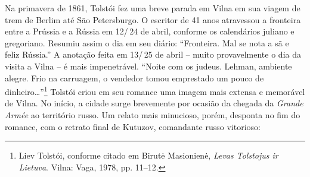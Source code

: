Na primavera de 1861, Tolstói fez uma breve parada em Vilna em sua
viagem de trem de Berlim até São Petersburgo. O escritor de 41 anos atravessou a fronteira entre a Prússia e a Rússia em 12/\,24 de
abril, conforme os calendários juliano e gregoriano. Resumiu assim o
dia em seu diário: ``Fronteira. Mal se nota a sã e feliz Rússia.'' A
anotação feita em 13/\,25 de abril -- muito provavelmente o dia da visita a
Vilna -- é mais impenetrável. ``Noite com os judeus. Lehman, ambiente
alegre. Frio na carruagem, o vendedor tomou emprestado um pouco de
dinheiro\ldots{}''\footnote{Liev Tolstói, conforme citado em Birutė Masionienė, \textit{Levas Tolstojus ir Lietuva}. Vilna: Vaga, 1978, pp. 11--12.} Tolstói criou em seu romance uma imagem mais extensa e memorável de Vilna. No início, a cidade surge brevemente por ocasião da
chegada da \textit{Grande Armée} ao território russo. Um relato mais
minucioso, porém, desponta no fim do romance, com o retrato final de
Kutuzov, comandante russo vitorioso:

